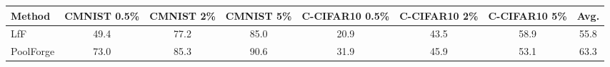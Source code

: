 \begin{tabular}{lccccccc}
\toprule
Method & CMNIST 0.5\% & CMNIST 2\% & CMNIST 5\% & C-CIFAR10 0.5\% & C-CIFAR10 2\% & C-CIFAR10 5\% & Avg. \\
\midrule
LfF & 49.4 & 77.2 & 85.0 & 20.9 & 43.5 & 58.9 & 55.8 \\
\rowcolor{ours}PoolForge & 73.0 & 85.3 & 90.6 & 31.9 & 45.9 & 53.1 & 63.3 \\
\bottomrule
\end{tabular}
